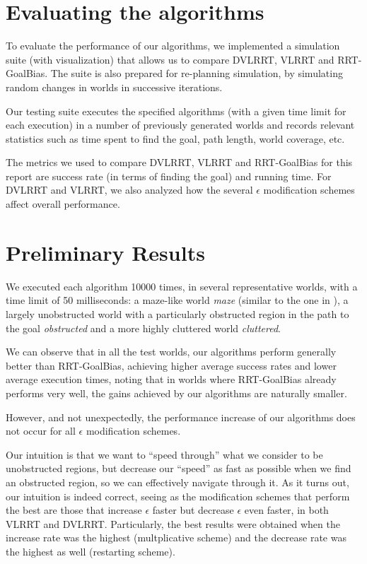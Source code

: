 \documentclass[10pt,twoside,twocolumn]{article}
\begin{document}
\section{Evaluating the algorithms}

To evaluate the performance of our algorithms, we implemented a simulation suite (with visualization) that allows
us to compare DVLRRT, VLRRT and RRT-GoalBias. The suite is also prepared for re-planning simulation, by simulating
random changes in worlds in successive iterations.

Our testing suite executes the specified algorithms (with a given time limit for each execution) in a number of previously
generated worlds and records relevant statistics such as time spent to find the goal, path length, world coverage, etc.

The metrics we used to compare DVLRRT, VLRRT and RRT-GoalBias for this report are success rate (in terms of finding the goal) and running
time. For DVLRRT and VLRRT, we also analyzed how the several $\epsilon$ modification schemes affect overall performance.

\section{Preliminary Results}


We executed each algorithm 10000 times, in several representative worlds, with a time limit of 50 milliseconds: 
a maze-like world \emph{maze} (similar to the one in
\cite{Bruce02real-timerandomized}), a largely unobstructed world with a particularly obstructed region in the path to the goal \emph{obstructed} and a more highly cluttered world \emph{cluttered}.

We can observe that in all the test worlds, our algorithms perform generally better than RRT-GoalBias,
achieving higher average success rates and lower average execution
times, noting that in worlds where RRT-GoalBias already performs
very well, the gains achieved by our algorithms are naturally smaller.

However, and not unexpectedly, the performance increase of our algorithms does not occur for all
$\epsilon$ modification schemes. 

Our intuition is that we want to ``speed through'' what we consider to be unobstructed regions, but decrease our
``speed'' as fast as possible when we find an obstructed region, so we can effectively navigate through it. As it turns
out, our intuition is indeed correct, seeing as the modification schemes that perform the best are those that
increase $\epsilon$ faster but decrease $\epsilon$ even faster, in both VLRRT and DVLRRT. Particularly, the best
results were obtained when the increase rate was the highest (multplicative scheme) and the decrease rate was the 
highest as well (restarting scheme).
\end{document}

